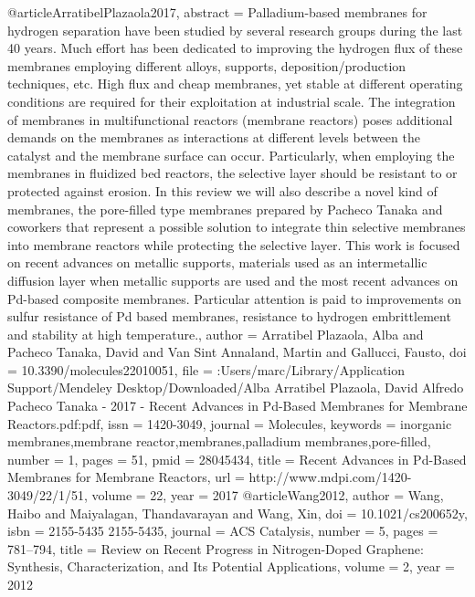 @article{ArratibelPlazaola2017,
abstract = {Palladium-based membranes for hydrogen separation have been studied by several research groups during the last 40 years. Much effort has been dedicated to improving the hydrogen flux of these membranes employing different alloys, supports, deposition/production techniques, etc. High flux and cheap membranes, yet stable at different operating conditions are required for their exploitation at industrial scale. The integration of membranes in multifunctional reactors (membrane reactors) poses additional demands on the membranes as interactions at different levels between the catalyst and the membrane surface can occur. Particularly, when employing the membranes in fluidized bed reactors, the selective layer should be resistant to or protected against erosion. In this review we will also describe a novel kind of membranes, the pore-filled type membranes prepared by Pacheco Tanaka and coworkers that represent a possible solution to integrate thin selective membranes into membrane reactors while protecting the selective layer. This work is focused on recent advances on metallic supports, materials used as an intermetallic diffusion layer when metallic supports are used and the most recent advances on Pd-based composite membranes. Particular attention is paid to improvements on sulfur resistance of Pd based membranes, resistance to hydrogen embrittlement and stability at high temperature.},
author = {{Arratibel Plazaola}, Alba and {Pacheco Tanaka}, David and {Van Sint Annaland}, Martin and Gallucci, Fausto},
doi = {10.3390/molecules22010051},
file = {:Users/marc/Library/Application Support/Mendeley Desktop/Downloaded/Alba Arratibel Plazaola, David Alfredo Pacheco Tanaka - 2017 - Recent Advances in Pd-Based Membranes for Membrane Reactors.pdf:pdf},
issn = {1420-3049},
journal = {Molecules},
keywords = {inorganic membranes,membrane reactor,membranes,palladium membranes,pore-filled},
number = {1},
pages = {51},
pmid = {28045434},
title = {{Recent Advances in Pd-Based Membranes for Membrane Reactors}},
url = {http://www.mdpi.com/1420-3049/22/1/51},
volume = {22},
year = {2017}
}
@article{Wang2012,
author = {Wang, Haibo and Maiyalagan, Thandavarayan and Wang, Xin},
doi = {10.1021/cs200652y},
isbn = {2155-5435
2155-5435},
journal = {ACS Catalysis},
number = {5},
pages = {781--794},
title = {{Review on Recent Progress in Nitrogen-Doped Graphene: Synthesis, Characterization, and Its Potential Applications}},
volume = {2},
year = {2012}
}
